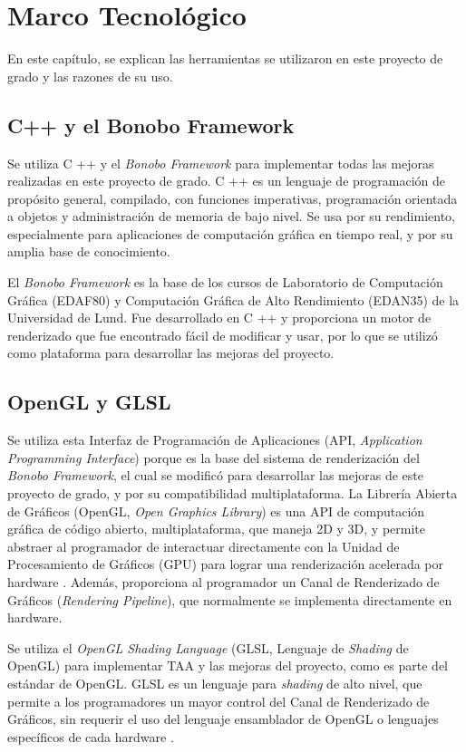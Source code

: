 \documentclass[pregrado]{tesis-usb} %
\begin{document}
\chapter{Marco Tecnológico}
En este capítulo, se explican las herramientas se utilizaron en este proyecto de grado y las razones de su uso.

\section{C++ y el Bonobo Framework}
Se utiliza C ++ y el \textit{Bonobo Framework} para implementar todas las mejoras realizadas en este proyecto de grado. C ++ es un lenguaje de programación de propósito general, compilado, con funciones imperativas, programación orientada a objetos y administración de memoria de bajo nivel. Se usa por su rendimiento, especialmente para aplicaciones de computación gráfica en tiempo real, y por su amplia base de conocimiento.

El \textit{Bonobo Framework} es la base de los cursos de Laboratorio de Computación Gráfica (EDAF80) y Computación Gráfica de Alto Rendimiento (EDAN35) de la Universidad de Lund. Fue desarrollado en C ++ y proporciona un motor de renderizado que fue encontrado fácil de modificar y usar, por lo que se utilizó como plataforma para desarrollar las mejoras del proyecto.


\section{OpenGL y GLSL}
Se utiliza esta Interfaz de Programación de Aplicaciones (API, \textit{Application Programming Interface}) porque es la base del sistema de renderización del \textit{Bonobo Framework}, el cual se modificó para desarrollar las mejoras de este proyecto de grado, y por su compatibilidad multiplataforma. La Librería Abierta de Gráficos (OpenGL, \textit{Open Graphics Library}) es una API de computación gráfica de código abierto, multiplataforma, que maneja 2D y 3D, y permite abstraer al programador de interactuar directamente con la Unidad de Procesamiento de Gráficos (GPU) para lograr una renderización acelerada por hardware \cite{Doggett2017EDAF80}. Además, proporciona al programador un Canal de Renderizado de Gráficos (\textit{Rendering Pipeline}), que normalmente se implementa directamente en hardware.

Se utiliza el \textit{OpenGL Shading Language} (GLSL, Lenguaje de \textit{Shading} de OpenGL) para implementar TAA y las mejoras del proyecto, como es parte del estándar de OpenGL. GLSL es un lenguaje para \textit{shading} de alto nivel, que permite a los programadores un mayor control del Canal de Renderizado de Gráficos, sin requerir el uso del lenguaje ensamblador de OpenGL o lenguajes específicos de cada hardware \cite{Doggett2017EDAF80}.
\end{document}
